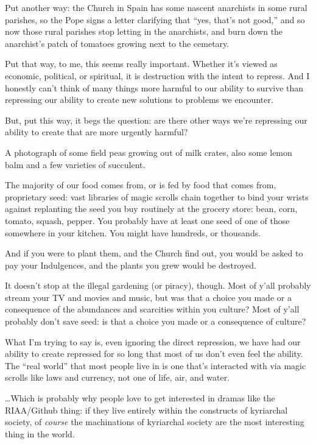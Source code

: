 \documentclass[11pt]{article}
\begin{document}
\begin{itemize}
Put another way: the Church in Spain has some nascent anarchists in some rural parishes, so the Pope signs a letter clarifying that “yes, that’s not good,” and so now those rural parishes stop letting in the anarchists, and burn down the anarchist’s patch of tomatoes growing next to the cemetary.

Put that way, to me, this seems really important. Whether it’s viewed as economic, political, or spiritual, it is destruction with the intent to repress. And I honestly can’t think of many things more harmful to our ability to survive than repressing our ability to create new solutions to problems we encounter.

But, put this way, it begs the question: are there other ways we’re repressing our ability to create that are more urgently harmful?

A photograph of some field peas growing out of milk crates, also some lemon balm and a few varieties of succulent.

The majority of our food comes from, or is fed by food that comes from, proprietary seed: vast libraries of magic scrolls chain together to bind your wrists against replanting the seed you buy routinely at the grocery store: bean, corn, tomato, squash, pepper. You probably have at least one seed of one of those somewhere in your kitchen. You might have hundreds, or thousands.

And if you were to plant them, and the Church find out, you would be asked to pay your Indulgences, and the plants you grew would be destroyed.

It doesn’t stop at the illegal gardening (or piracy), though. Most of y’all probably stream your TV and movies and music, but was that a choice you made or a consequence of the abundances and scarcities within you culture? Most of y’all probably don’t save seed: is that a choice you made or a consequence of culture?

What I’m trying to say is, even ignoring the direct repression, we have had our ability to create repressed for so long that most of us don’t even feel the ability. The “real world” that most people live in is one that’s interacted with via magic scrolls like laws and currency, not one of life, air, and water.

…Which is probably why people love to get interested in dramas like the RIAA/Github thing: if they live entirely within the constructs of kyriarchal society, of \emph{course} the machinations of kyriarchal society are the most interesting thing in the world.


\end{itemize}
\end{document}
